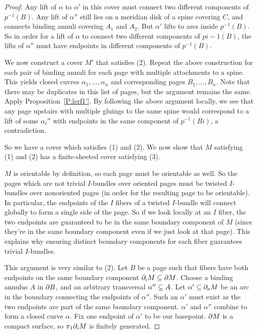 \begin{proof}
Any lift of $\alpha$ to $\alpha'$ in this cover must connect two different
components of $p^{-1}(B)$.  Any lift of $\alpha''$ still lies on a meridian
disk of a spine covering $C$, and connects binding annuli covering $A_1$ and
$A_2$.  But $\alpha'$ lifts to arcs inside $p^{-1}(B)$. So in order for a lift
of $\alpha$ to connect two different components of $pi-1(B)$, the lifts of
$\alpha''$ must have endpoints in different components of $p^{-1}(B)$.

We now construct a cover $M'$ that satisfies (2). Repeat the above construction
for each pair of binding annuli for each page with multiple attachments to
a spine. This yields closed cuvres $\alpha_1,\dots,\alpha_n$ and corresponding
pages $B_1,\dots,B_n$. Note that there may be duplicates in this list of pages,
but the argument remains the same. Apply Proposition~\ref{P:lerf1'}. By
following the above argument locally, we see that any page upstairs with
multiple gluings to the same spine would correspond to a lift of some
$\alpha_i''$ with endpoints in the same component of $p^{-1}(Bi)$,
a contradiction.

So we have a cover which satisfies (1) and (2). We now show that $M$ satisfying
(1) and (2) has a finite-sheeted cover satisfying (3).

$M$ is orientable by definition, so each page must be orientable as well. So
the pages which are not trivial $I$-bundles over oriented pages must be twisted
$I$-bundles over nonoriented pages (in order for the resulting page to be
orientable). In particular, the endpoints of the $I$ fibers of a twisted
$I$-bundle will connect globally to form a single side of the page. So if we
look locally at an $I$ fiber, the two endpoints are guaranteed to be in the
same boundary component of $M$ (since they're in the same boundary component
even if we just look at that page). This explains why ensuring distinct
boundary components for each fiber guarantees trivial $I$-bundles.

This argument is very similar to (2). Let $B$ be a page such that fibers have
both endpoints on the same boundary component $\partial_i M \subseteq \partial M$.  Choose
a binding annulus $A$ in $\partial B$, and an arbitrary transversal $\alpha'' \subseteq
A$.  Let $\alpha' \subseteq \partial_a M$ be an arc in the boundary connecting the
endpoints of $\alpha''$. Such an $\alpha'$ must exist as the two endpoints are
part of the same boundary component. $\alpha'$ and $\alpha''$ combine to form
a closed curve $\alpha$.  Fix one endpoint of $\alpha'$ to be our basepoint.
$\partial M$ is a compact surface, so $\pi_1 \partial_i M$ is finitely generated.


\end{proof}
